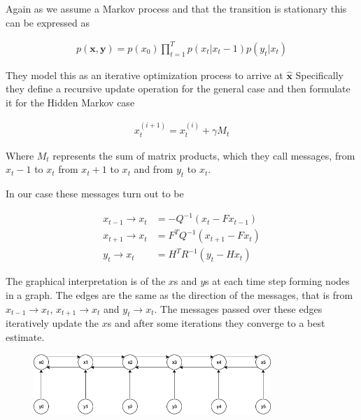 \documentclass[]{../resources/final_report}
\begin{document}
Again as we assume a Markov process and that the transition is stationary this can be expressed as 

\begin{align}
  p(\mathbf{x},\mathbf{y}) = p(x_0)\prod_{t=1}^T p(x_t|x_t-1) p(y_t|x_t)
\end{align}

They model this as an iterative optimization process to arrive at $\mathbf{\hat{x}}$
Specifically they define a recursive update operation for the general case and then formulate it 
for the Hidden Markov case

\begin{align}
  x_t^{(i+1)} = x_t^{(i)} + \gamma M_t
\end{align}

Where $M_t$ represents the sum of matrix products, which they call messages, from $x_t-1$ to $x_t$ 
from $x_t+1$ to $x_t$ and from $y_t$ to $x_t$.

In our case these messages turn out to be

\begin{align}
  x_{t-1} \rightarrow x_{t} &= -Q^{-1}(x_t - Fx_{t-1}) \\
  x_{t+1} \rightarrow x_{t} &= F^TQ^{-1}(x_{t+1} - Fx_t) \\
  y_t \rightarrow x_t &= H^TR^{-1}(y_t - Hx_t) 
\end{align}

  

The graphical interpretation is of the $x$s and $y$s at each time step forming nodes in a graph. The 
edges are the same as the direction of the messages, that is from $x_{t-1} \rightarrow x_t$, $x_{t+1} \rightarrow x_t$ and $y_t \rightarrow x_t$. 
The messages passed over these edges iteratively update the $x$s and after some iterations they 
converge to a best estimate.


\begin{figure}[h]
  \centering
  \includegraphics[width=0.8\textwidth]{GraphicalKalmanModel.png}  
  \caption{}
  \label{}
\end{figure}
\end{document}
